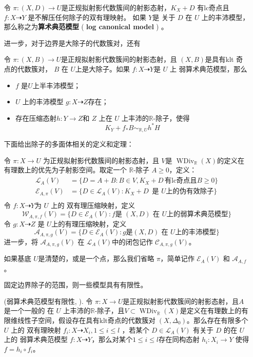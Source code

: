 \begin{definition}
  令 $ \pi:(X, D)\to U $是正规拟射影代数簇间的射影态射，$ K_X+D $ 有lc奇点且$ f: X\dashrightarrow Y $ 是不解压任何除子的双有理映射。 如果 $ Y $是 关于 $D$ 在 $U$ 上的丰沛模型，那么称之为\textbf{算术典范模型} ( \textbf{log canonical model} ) 。
\end{definition}

进一步，对于边界是大除子的代数簇对，还有
\begin{lemma}\cite[lemma 3.9.3]{BCHM10} 令 $ \pi:(X,B)\to U $是正规拟射影代数簇间的射影态射，且 $(X, B)$是具有klt 奇点的代数簇对，  $B$ 在 $U$上是大除子。如果 $f:X\dashrightarrow Y$是 $U$ 上 弱算术典范模型，那么
  \begin{itemize}
    \item $f$ 是$U$上半丰沛模型；
    \item  $U$ 上的丰沛模型  $g:X \dashrightarrow Z$存在；
    \item  存在压缩态射$h:Y\to Z$和 $Z$ 上在 $U$ 上丰沛的$\mathbb{R}$-除子，使得 
      \[ K_{Y}+f_*B\sim_{\mathbb{R},U} h^*H \]
  \end{itemize}
\end{lemma}
下面给出除子的多面体相关的定义和定理：
\begin{definition}\label{polytopeofdivisor}
  \cite[Definition 1.1.4]{BCHM10} 令 $ \pi: X\to U $ 为正规拟射影代数簇间的射影态射，且 $ V $是 $ \operatorname{WDiv}_{\mathbb{R}}(X) $的定义在有理数上的优先为子射影空间。取定一个 $ \mathbb{R} $-除子 $ A\geqslant 0 $，定义：
  \[
    \begin{aligned}
      \mathcal{L}_A(V)       & =\{D=A+B:B \in V,  K_X+D\, \text{有lc奇点且} B\geqslant0 \} \\
    \mathcal{E}_{A,\pi}(V) & =\{D\in \mathcal{L}_A(V): K_X+D\, \text{ 是 } U \text{上的伪有效除子}\}  \\
    \end{aligned}
  \]
  令 $ f:X \dashrightarrow Y$为 $U$ 上的 双有理压缩映射，定义
  \[ \mathcal{W}_{A,\pi,f}(V)=\{D\in \mathcal{E}_{A}(V): f \text{是   } (X,D) \text{ 在 }U \text{上的弱算术典范模型}\} \]
  令 $g:X\dashrightarrow Z  $ 是 $ U $上的有理压缩映射，定义
  \[ \mathcal{A}_{A,\pi,g}(V)=\{D\in \mathcal{E}_{A}(V): g \text{是} (X,D) \text{ 在 }U \text{上的丰沛模型}\} \]
  进一步，将 $ \mathcal{A}_{A,\pi,g}(V) $ 在 $\mathcal{L}_{A}(V)$中的闭包记作 $ \mathcal{C}_{A,\pi,g}(V) $。

  如果基底 $U$是清楚的，或是一个点，那么我们省略 $\pi$，简单记作 $\mathcal{E}_{A}(V)$ 和 $\mathcal{A}_{A,f}$。
\end{definition}
固定边界除子的范围，则一些模型具有有限性。
\begin{theorem}\label{finitewlcm}
  (弱算术典范模型有限性, \cite[Theorem E]{BCHM10}).
  令 $\pi: X\to U$是正规拟射影代数簇间的射影态射，且$A$是一个一般的 在 $U$ 上丰沛的$\mathbb{R}$-除子，且$V \subset \operatorname{WDiv}_{\mathbb{R}}(X)$是定义在有理数上的有限维线性子空间，假设存在具有klt奇点的代数簇对 $(X,\Delta_{0})$。那么存在有限多个 $U$ 上的 双有理映射 $f_{i}:X \dashrightarrow X_{i},1\leqslant i\leqslant l$ ，若某个 $D \in \mathcal{L}_{A}(V)$ 有关于 $D$ 的在 $U$ 上的  弱算术典范模型 $f:X \dashrightarrow  Y$，那么对某个$1\leqslant i\leqslant l$存在同构态射  $h_{i}:X_{i} \to Y$ 使得 $f=h_{i}\circ f_{i}$。
\end{theorem}
